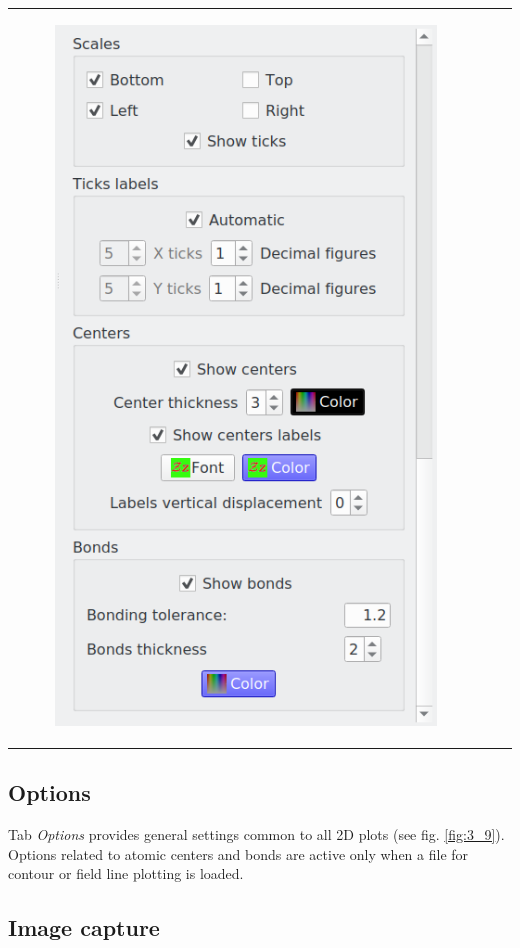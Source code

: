 \documentclass[10pt]{article}
\begin{document}
\begin{tabular}{lcr}
\begin{minipage}{.3\linewidth}
\begin{figure}[H]
\begin{center}
\includegraphics[width=.73\linewidth]{damqt320_2D_options_3.png}
\end{center}
\vspace*{-2mm}
\end{figure}
\end{minipage}
\end{tabular}

\subsection{Options \label{sec:3.7}}

Tab {\it Options} provides general settings common to all 2D plots  
(see fig. \ref{fig:3_9}). Options related to atomic centers and bonds  
are active only when a file for contour or field line plotting is loaded.  


\subsection{Image capture\label{sec:3.8}}
\end{document}
